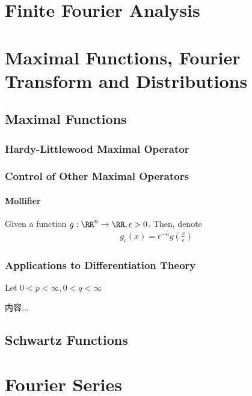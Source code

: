 \documentclass[Total.tex]{subfiles}
\begin{document}
	\chapter{Finite Fourier Analysis}
	
	\chapter{Maximal Functions, Fourier Transform and Distributions}
		\section{Maximal Functions}
			\subsection{Hardy-Littlewood Maximal Operator}
			
			\subsection{Control of Other Maximal Operators}
				\subsubsection{Mollifier}
					\begin{Def}
						Given a function $g:\RR^n\rightarrow \RR,\epsilon>0$. Then, denote
						\begin{gather*}
							g_\epsilon(x)=\epsilon^{-n}g(\frac{x}{\epsilon})
						\end{gather*}
					\end{Def}
					
			\subsection{Applications to Differentiation Theory}
				\begin{Def}
					Let $0<p<\infty,0<q<\infty$
				\end{Def}
				
				\begin{theorem}
					内容...
				\end{theorem}
		\section{Schwartz Functions}
	\chapter{Fourier Series}
\end{document}
